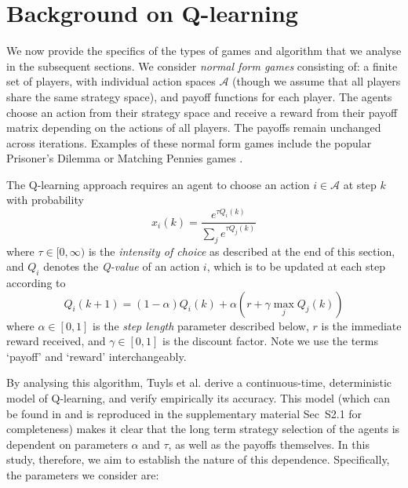 \documentclass{article}
\begin{document}



\section{Background on Q-learning}

We now provide the specifics of the types of games and algorithm that we analyse in the subsequent sections.
%
We consider \textit{normal form games} consisting of: a finite set of players, with individual action spaces $\mathcal{A}$ (though we assume that all players share the same strategy space), and payoff functions for each player. The agents choose an action from their strategy space and receive a reward from their payoff matrix depending on the actions of all players. The payoffs remain unchanged across iterations. Examples of these normal form games include the popular Prisoner's Dilemma or Matching Pennies games \cite{tuyls:iteratedgames}.

The Q-learning approach requires
an agent to choose an action $i \in \mathcal{A}$ at step $k$ with probability
%
\begin{equation}
    x_i(k) = \frac{e^{\tau Q_i(k)}}{\sum_j e^{\tau Q_j(k)}}
\end{equation}
%
where $\tau \in [0, \infty)$ is the \textit{intensity of choice} as described at the end of this section, and $Q_i$ denotes the \textit{Q-value} of an action $i$, which is to be updated at each step according to
%
\begin{equation}
\label{eqn::Qupdate}
    Q_i(k+1) = (1 - \alpha) Q_i(k) + \alpha (r + \gamma \max_j Q_j(k))
\end{equation}
%
where $\alpha \in [0, 1]$ is the \textit{step length} parameter described below, $r$ is the immediate reward received, and $\gamma \in [0, 1]$ is the discount factor. Note we use the terms `payoff' and `reward' interchangeably.

By analysing this algorithm, Tuyls et al. derive a continuous-time, deterministic model of Q-learning, and verify empirically its accuracy. This model (which can be found in \cite{tuyls:iteratedgames} and is reproduced in the supplementary material Sec~S2.1 for completeness) 
makes it clear that the long term strategy selection of the agents is dependent on parameters $\alpha$ and $\tau$, as well as the payoffs themselves. In this study, therefore, we aim to establish the nature of this dependence. Specifically, the parameters we consider are:
\end{document}
